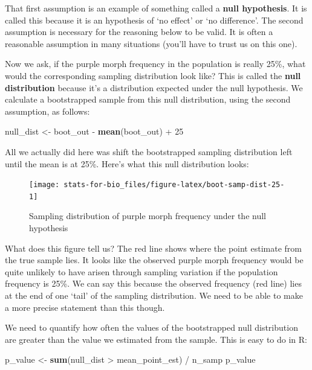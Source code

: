 \documentclass[]{book}
\newenvironment{Shaded}{\begin{snugshade}}{\end{snugshade}}
\newcommand{\KeywordTok}[1]{\textcolor[rgb]{0.13,0.29,0.53}{\textbf{{#1}}}}
\newcommand{\DecValTok}[1]{\textcolor[rgb]{0.00,0.00,0.81}{{#1}}}
\newcommand{\StringTok}[1]{\textcolor[rgb]{0.31,0.60,0.02}{{#1}}}
\newcommand{\NormalTok}[1]{{#1}}
\begin{document}
That first assumption is an example of something called a \textbf{null
hypothesis}. It is called this because it is an hypothesis of `no
effect' or `no difference'. The second assumption is necessary for the
reasoning below to be valid. It is often a reasonable assumption in many
situations (you'll have to trust us on this one).

Now we ask, if the purple morph frequency in the population is really
25\%, what would the corresponding sampling distribution look like? This
is called the \textbf{null distribution} because it's a distribution
expected under the null hypothesis. We calculate a bootstrapped sample
from this null distribution, using the second assumption, as follows:

\begin{Shaded}
\begin{Highlighting}[]
\NormalTok{null_dist <-}\StringTok{ }\NormalTok{boot_out -}\StringTok{ }\KeywordTok{mean}\NormalTok{(boot_out) +}\StringTok{ }\DecValTok{25}
\end{Highlighting}
\end{Shaded}

All we actually did here was shift the bootstrapped sampling
distribution left until the mean is at 25\%. Here's what this null
distribution looks:

\begin{figure}

{\centering \texttt{[image: stats-for-bio\_files/figure-latex/boot-samp-dist-25-1]} 

}

\caption{Sampling distribution of purple morph frequency under the null hypothesis}\label{fig:boot-samp-dist-25}
\end{figure}

What does this figure tell us? The red line shows where the point
estimate from the true sample lies. It looks like the observed purple
morph frequency would be quite unlikely to have arisen through sampling
variation if the population frequency is 25\%. We can say this because
the observed frequency (red line) lies at the end of one `tail' of the
sampling distribution. We need to be able to make a more precise
statement than this though.

We need to quantify how often the values of the bootstrapped null
distribution are greater than the value we estimated from the sample.
This is easy to do in R:

\begin{Shaded}
\begin{Highlighting}[]
\NormalTok{p_value <-}\StringTok{ }\KeywordTok{sum}\NormalTok{(null_dist >}\StringTok{ }\NormalTok{mean_point_est) /}\StringTok{ }\NormalTok{n_samp}
\NormalTok{p_value}
\end{Highlighting}
\end{Shaded}
\end{document}
